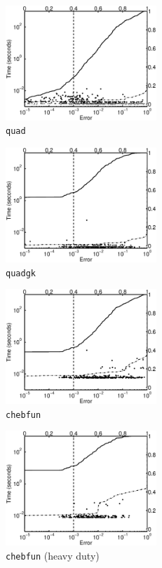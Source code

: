 \documentclass[graybox]{svmult}
\begin{document}
\begin{figure}
\centering
\begin{minipage}{5.7cm} \centering \includegraphics[width=5.7cm]{137gaussiand=1quadErrTime.eps} \\ {\tt quad} \end{minipage}
\begin{minipage}{5.7cm} \centering \includegraphics[width=5.7cm]{137gaussiand=1quadgkErrTime.eps} \\ {\tt quadgk} \end{minipage}
\begin{minipage}{5.7cm} \centering \includegraphics[width=5.7cm]{137gaussiand=1chebfunErrTime.eps} \\ {\tt chebfun} \end{minipage}
\begin{minipage}{5.7cm} \centering \includegraphics[width=5.7cm]{137gaussiand=1chebfunheavyErrTime.eps} \\ {\tt chebfun}  (heavy duty) \end{minipage}

\end{figure}
\end{document}
